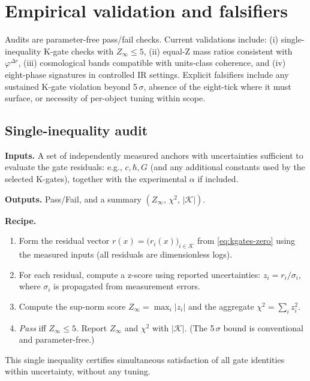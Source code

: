 \documentclass[11pt]{article}
\begin{document}
\section{Empirical validation and falsifiers}\label{sec:empirical}
Audits are parameter\mbox{-}free pass/fail checks. Current validations include: (i) single\mbox{-}inequality K\mbox{-}gate checks with \(Z_\infty\le 5\), (ii) equal\mbox{-}Z mass ratios consistent with \(\varphi^{\Delta r}\), (iii) cosmological bands compatible with units\mbox{-}class coherence, and (iv) eight\mbox{-}phase signatures in controlled IR settings. Explicit falsifiers include any sustained K\mbox{-}gate violation beyond 5\,\(\sigma\), absence of the eight\mbox{-}tick where it must surface, or necessity of per\mbox{-}object tuning within scope.

\subsection{Single\mbox{-}inequality audit}
\textbf{Inputs.} A set of independently measured anchors with uncertainties sufficient to evaluate the gate residuals: e.g., \(c,\hbar,G\) (and any additional constants used by the selected K\mbox{-}gates), together with the experimental \(\alpha\) if included.

\textbf{Outputs.} Pass/Fail, and a summary \((Z_\infty,\, \chi^2,\, |\mathcal{K}|)\).

\textbf{Recipe.}
\begin{enumerate}
  \item Form the residual vector \(r(x)=\bigl(r_i(x)\bigr)_{i\in\mathcal{K}}\) from \eqref{eq:kgates-zero} using the measured inputs (all residuals are dimensionless logs).
  \item For each residual, compute a z\mbox{-}score using reported uncertainties: \(z_i = r_i/\sigma_i\), where \(\sigma_i\) is propagated from measurement errors.
  \item Compute the sup\mbox{-}norm score \(Z_\infty=\max_i |z_i|\) and the aggregate \(\chi^2=\sum_i z_i^2\).
  \item \emph{Pass} iff \(Z_\infty \le 5\). Report \(Z_\infty\) and \(\chi^2\) with \(|\mathcal{K}|\). (The 5\,\(\sigma\) bound is conventional and parameter\mbox{-}free.)
\end{enumerate}
This single inequality certifies simultaneous satisfaction of all gate identities within uncertainty, without any tuning.
\end{document}
